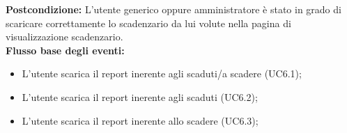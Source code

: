 \textbf{Postcondizione:} L’utente generico oppure amministratore è stato in grado di scaricare correttamente lo scadenzario da lui volute nella pagina di visualizzazione scadenzario.  \\


\textbf{Flusso base degli eventi:} 

\begin{itemize}

\item L’utente scarica il report inerente agli scaduti/a scadere (UC6.1);
\item L’utente scarica il report inerente agli scaduti  (UC6.2);
\item L’utente scarica il report inerente allo scadere (UC6.3);


\end{itemize}



